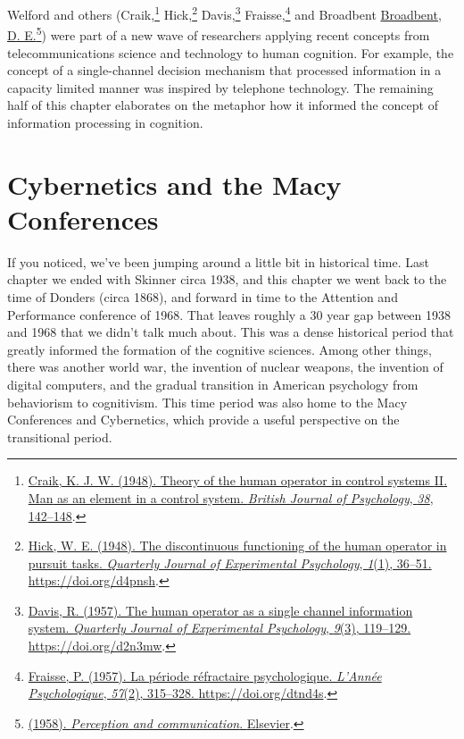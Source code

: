 \documentclass[
  oneside,
  12pt]{crumpbook}
\begin{document}
Welford and others (Craik,\footnote{\protect\hyperlink{ref-craikTheoryHumanOperator1948}{Craik, K. J. W. (1948). Theory of the human operator in control systems {II}. {Man} as an element in a control system. \emph{British Journal of Psychology}, \emph{38}, 142--148}.} Hick,\footnote{\protect\hyperlink{ref-hickDiscontinuousFunctioningHuman1948}{Hick, W. E. (1948). The discontinuous functioning of the human operator in pursuit tasks. \emph{Quarterly Journal of Experimental Psychology}, \emph{1}(1), 36--51. \url{https://doi.org/d4pnsh}}.} Davis,\footnote{\protect\hyperlink{ref-davisHumanOperatorSingle1957}{Davis, R. (1957). The human operator as a single channel information system. \emph{Quarterly Journal of Experimental Psychology}, \emph{9}(3), 119--129. \url{https://doi.org/d2n3mw}}.} Fraisse,\footnote{\protect\hyperlink{ref-fraissePeriodeRefractairePsychologique1957}{Fraisse, P. (1957). La période réfractaire psychologique. \emph{L'Année Psychologique}, \emph{57}(2), 315--328. \url{https://doi.org/dtnd4s}}.} and Broadbent \protect\hyperlink{ref-broadbentPerceptionCommunication1958}{Broadbent, D. E.}\footnote{\protect\hyperlink{ref-broadbentPerceptionCommunication1958}{(1958). \emph{Perception and communication}. {Elsevier}}.}) were part of a new wave of researchers applying recent concepts from telecommunications science and technology to human cognition. For example, the concept of a single-channel decision mechanism that processed information in a capacity limited manner was inspired by telephone technology. The remaining half of this chapter elaborates on the metaphor how it informed the concept of information processing in cognition.

\hypertarget{cybernetics-and-the-macy-conferences}{%
\section{Cybernetics and the Macy Conferences}\label{cybernetics-and-the-macy-conferences}}

If you noticed, we've been jumping around a little bit in historical time. Last chapter we ended with Skinner circa 1938, and this chapter we went back to the time of Donders (circa 1868), and forward in time to the Attention and Performance conference of 1968. That leaves roughly a 30 year gap between 1938 and 1968 that we didn't talk much about. This was a dense historical period that greatly informed the formation of the cognitive sciences. Among other things, there was another world war, the invention of nuclear weapons, the invention of digital computers, and the gradual transition in American psychology from behaviorism to cognitivism. This time period was also home to the Macy Conferences and Cybernetics, which provide a useful perspective on the transitional period.
\end{document}
